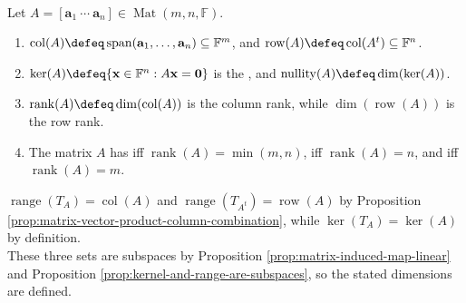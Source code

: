 \begin{definition} \label{def:column-space-matrix-rank-nullity} \\
Let $A=[\mathbf{a}_1\ \cdots\ \mathbf{a}_n]\in\operatorname{Mat}(m,n,\mathbb{F})$.
\begin{enumerate}[label=(\roman*)]
\setlength{\itemsep}{0pt}
\item $\operatorname{col}(A)\defeq\operatorname{span}(\mathbf{a}_1,\ldots,\mathbf{a}_n)\subseteq\mathbb{F}^m$, and $\operatorname{row}(A)\defeq\operatorname{col}(A^t)\subseteq\mathbb{F}^n$.
\item $\ker(A)\defeq\{\mathbf{x}\in\mathbb{F}^n:A\mathbf{x}=\mathbf{0}\}$ is the , and $\operatorname{nullity}(A)\defeq\dim(\ker(A))$.
\item $\operatorname{rank}(A)\defeq\dim(\operatorname{col}(A))$ is the column rank, while $\dim(\operatorname{row}(A))$ is the row rank.
\item The matrix $A$ has  iff $\operatorname{rank}(A)=\min(m,n)$,  iff $\operatorname{rank}(A)=n$, and  iff $\operatorname{rank}(A)=m$.
\end{enumerate}
$\operatorname{range}(T_A)=\operatorname{col}(A)$ and $\operatorname{range}(T_{A^t})=\operatorname{row}(A)$ by Proposition \ref{prop:matrix-vector-product-column-combination}, while $\ker(T_A)=\ker(A)$ by definition.\\
These three sets are subspaces by Proposition \ref{prop:matrix-induced-map-linear} and Proposition \ref{prop:kernel-and-range-are-subspaces}, so the stated dimensions are defined.
\end{definition}

